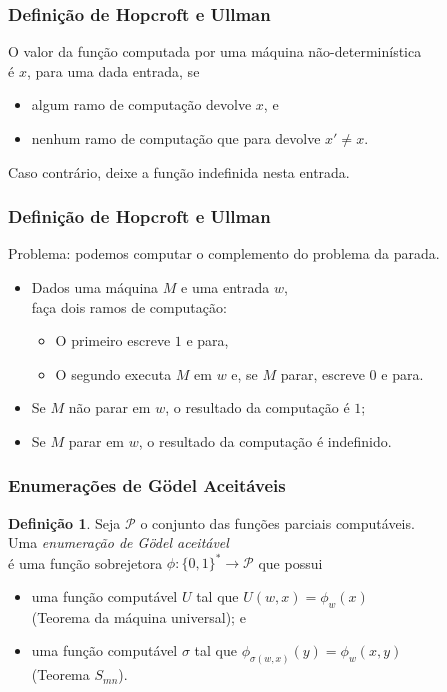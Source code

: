 \documentclass[utf8,notheorems]{beamer}
\theoremstyle{definition}
\newtheorem*{definition}{Definição}
\begin{document}
\begin{frame}
    \frametitle{Definição de Hopcroft e Ullman}
    O valor da função computada por uma máquina não-determinística \\
    é $x$, para uma dada entrada, se
    \begin{itemize}
        \item algum ramo de computação devolve $x$, e
        \item nenhum ramo de computação que para devolve $x' \neq x$.
    \end{itemize}
    Caso contrário, deixe a função indefinida nesta entrada.
    \cite[p.~313]{HopcroftUllman1979}
\end{frame}

\begin{frame}
    \frametitle{Definição de Hopcroft e Ullman}
    Problema: podemos computar o complemento do problema da parada.
    \begin{itemize}
        \item Dados uma máquina $M$ e uma entrada $w$, \\
            faça dois ramos de computação:
            \begin{itemize}
                \item O primeiro escreve $1$ e para,
                \item O segundo executa $M$ em $w$ e, se $M$ parar,
                    escreve $0$ e para.
            \end{itemize}
        \item Se $M$ não parar em $w$,
            o resultado da computação é $1$;
        \item Se $M$ parar em $w$,
            o resultado da computação é indefinido.
    \end{itemize}
\end{frame}

\begin{frame}
    \frametitle{Enumerações de Gödel Aceitáveis}
    \begin{definition}
        Seja $\mathcal P$ o conjunto das funções parciais computáveis. \\
        Uma \emph{enumeração de Gödel aceitável} \\
        é uma função sobrejetora $\phi: \{0, 1\}^* \to \mathcal P$ que possui
        \begin{itemize}
            \item uma função computável $U$ tal que $U(w, x) = \phi_w(x)$ \\
                (Teorema da máquina universal); e
            \item uma função computável $\sigma$ tal que
                    $\phi_{\sigma(w, x)}(y) = \phi_w(x, y)$ \\
                (Teorema $S_{mn}$).
        \end{itemize}
        {\cite[p.~41]{Rogers1987}}
    \end{definition}
\end{frame}
\end{document}
